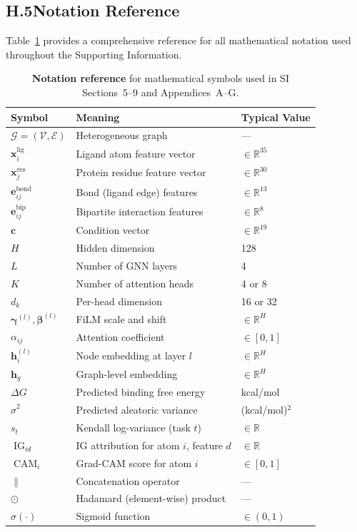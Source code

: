 \documentclass[11pt]{article}
\begin{document}
\subsection*{H.5\quad Notation Reference}

Table~\ref{tab:app_notation} provides a comprehensive reference for
all mathematical notation used throughout the Supporting Information.

\begin{table}[H]
\small
\centering
\caption{\textbf{Notation reference} for mathematical symbols used in
  SI Sections~5--9 and Appendices~A--G.}
\label{tab:app_notation}
\begin{tabular}{lll}
\toprule
\textbf{Symbol} & \textbf{Meaning} & \textbf{Typical Value} \\
\midrule
$\mathcal{G} = (\mathcal{V}, \mathcal{E})$ & Heterogeneous graph & --- \\
$\mathbf{x}_i^{\mathrm{lig}}$ & Ligand atom feature vector & $\in \mathbb{R}^{35}$ \\
$\mathbf{x}_j^{\mathrm{res}}$ & Protein residue feature vector & $\in \mathbb{R}^{30}$ \\
$\mathbf{e}_{ij}^{\mathrm{bond}}$ & Bond (ligand edge) features & $\in \mathbb{R}^{13}$ \\
$\mathbf{e}_{ij}^{\mathrm{bip}}$ & Bipartite interaction features & $\in \mathbb{R}^{8}$ \\
$\mathbf{c}$ & Condition vector & $\in \mathbb{R}^{19}$ \\
$H$ & Hidden dimension & 128 \\
$L$ & Number of GNN layers & 4 \\
$K$ & Number of attention heads & 4 or 8 \\
$d_k$ & Per-head dimension & 16 or 32 \\
$\boldsymbol{\gamma}^{(l)}, \boldsymbol{\beta}^{(l)}$
  & FiLM scale and shift & $\in \mathbb{R}^{H}$ \\
$\alpha_{ij}$ & Attention coefficient & $\in [0, 1]$ \\
$\mathbf{h}_i^{(l)}$ & Node embedding at layer $l$ & $\in \mathbb{R}^{H}$ \\
$\mathbf{h}_g$ & Graph-level embedding & $\in \mathbb{R}^{H}$ \\
$\Delta G$ & Predicted binding free energy & kcal/mol \\
$\hat{\sigma}^2$ & Predicted aleatoric variance & (kcal/mol)$^2$ \\
$s_t$ & Kendall log-variance (task $t$) & $\in \mathbb{R}$ \\
$\operatorname{IG}_{id}$ & IG attribution for atom $i$, feature $d$ & $\in \mathbb{R}$ \\
$\operatorname{CAM}_i$ & Grad-CAM score for atom $i$ & $\in [0, 1]$ \\
$\|$ & Concatenation operator & --- \\
$\odot$ & Hadamard (element-wise) product & --- \\
$\sigma(\cdot)$ & Sigmoid function & $\in (0, 1)$ \\
\bottomrule
\end{tabular}
\end{table}

\label{app:software_end}



\end{document}
